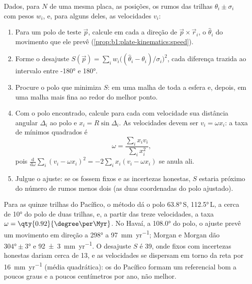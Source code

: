 \begin{method}\label{met:b1:hotspots:pole-fit}
Dados, para $N$  de uma mesma placa, as posições, os rumos das trilhas $\theta_i \pm \sigma_i$ com pesos $w_i$, e, para alguns deles, as velocidades $v_i$:
\begin{enumerate}
  \item Para um polo de teste $\vec p$, calcule em cada  a direção de
        $\vec p\times\vec r_i$, o  $\hat\theta_i$ do movimento que ele prevê (\cref{prop:b1:plate-kinematics:speed}).
  \item Forme o desajuste $S(\vec p) = \sum_i w_i\bigl((\hat\theta_i -
        \theta_i)/\sigma_i\bigr)^2$, cada diferença trazida ao intervalo entre \ang{-180} e \ang{180}.
  \item Procure o polo que minimiza $S$: em uma malha de toda a esfera e, depois, em uma malha mais fina ao redor do melhor ponto.
  \item Com o polo encontrado, calcule para cada  com velocidade sua distância angular $\Delta_i$ ao polo e $x_i = R\sin\Delta_i$. As velocidades devem ser $v_i = \omega x_i$: a taxa de mínimos quadrados é
        \[
          \omega = \frac{\sum_i x_i v_i}{\sum_i x_i^2},
        \]
        pois $\frac{\mathrm d}{\mathrm d\omega}\sum_i (v_i - \omega x_i)^2 =
        -2\sum_i x_i(v_i - \omega x_i)$ se anula ali.
  \item Julgue o ajuste: se os  fossem fixos e as incertezas honestas, $S$ estaria próximo do número de rumos menos dois (as duas coordenadas do polo ajustado).
\end{enumerate}
\end{method}

Para as quinze trilhas do Pacífico, o método dá o polo \ang{63.8}\,S,
\ang{112.5}\,L, a cerca de \ang{10} do polo de duas trilhas, e, a partir das treze velocidades, a taxa $\omega = \qty{0.92}{\degree\per\Myr}$. No Havaí, a \ang{108.0} do polo, o ajuste prevê um movimento em direção a \ang{298} a \qty{97}{mm.yr^{-1}}; Morgan e Morgan dão $\ang{304}\pm\ang{3}$ e \qty[uncertainty-mode=separate]{92 \pm 3}{mm.yr^{-1}}. O desajuste $S$ é 39, onde  fixos com incertezas honestas dariam cerca de 13, e as velocidades se dispersam em torno da reta por \qty{16}{mm.yr^{-1}} (média quadrática): os  do Pacífico formam um referencial bom a poucos graus e a poucos centímetros por ano, não melhor.

